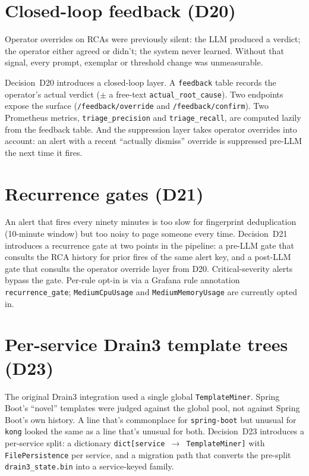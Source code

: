 \documentclass[11pt,a4paper,oneside]{report}
\begin{document}
\section{Closed-loop feedback (D20)}

Operator overrides on RCAs were previously silent: the LLM produced a
verdict; the operator either agreed or didn't; the system never
learned.  Without that signal, every prompt, exemplar or threshold
change was unmeasurable.

Decision~D20 introduces a closed-loop layer.  A \texttt{feedback}
table records the operator's actual verdict ($\pm$ a free-text
\texttt{actual\_root\_cause}).  Two endpoints expose the surface
(\texttt{/feedback/override} and \texttt{/feedback/confirm}).  Two
Prometheus metrics, \texttt{triage\_precision} and
\texttt{triage\_recall}, are computed lazily from the feedback
table.  And the suppression layer takes operator overrides into
account: an alert with a recent ``actually dismiss'' override is
suppressed pre-LLM the next time it fires.

\section{Recurrence gates (D21)}

An alert that fires every ninety minutes is too slow for fingerprint
deduplication (10-minute window) but too noisy to page someone every
time.  Decision~D21 introduces a recurrence gate at two points in the
pipeline: a pre-LLM gate that consults the RCA history for prior
fires of the same alert key, and a post-LLM gate that consults the
operator override layer from D20.  Critical-severity alerts bypass
the gate.  Per-rule opt-in is via a Grafana rule annotation
\texttt{recurrence\_gate}; \texttt{MediumCpuUsage} and
\texttt{MediumMemoryUsage} are currently opted in.

\section{Per-service Drain3 template trees (D23)}

The original Drain3 integration used a single global
\texttt{TemplateMiner}.  Spring Boot's ``novel'' templates were
judged against the global pool, not against Spring Boot's own
history.  A line that's commonplace for \texttt{spring-boot} but
unusual for \texttt{kong} looked the same as a line that's unusual
for both.  Decision~D23 introduces a per-service split: a dictionary
\texttt{dict[service $\to$ TemplateMiner]} with \texttt{FilePersistence}
per service, and a migration path that converts the pre-split
\texttt{drain3\_state.bin} into a service-keyed family.
\end{document}
